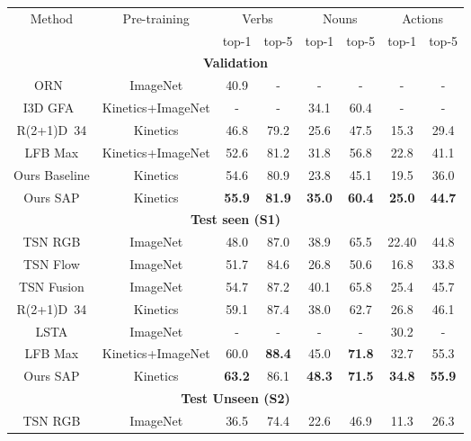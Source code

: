 \documentclass[letterpaper]{article} \usepackage{aaai20}  \usepackage{times}  \usepackage{helvet} \usepackage{courier}  \usepackage[hyphens]{url}  \usepackage{graphicx} \urlstyle{rm} \def\UrlFont{\rm}  \usepackage{graphicx}  \frenchspacing  \setlength{\pdfpagewidth}{8.5in}  \setlength{\pdfpageheight}{11in}  \usepackage{amsfonts,amssymb}
\begin{document}
\begin{table*}[t]
\centering
\begin{tabular}{|c|c|c|c|c|c|c|c|}
\hline
\multirow{2}{*}{Method} & \multirow{2}{*}{Pre-training} & \multicolumn{2}{c|}{Verbs} & \multicolumn{2}{c|}{Nouns} & \multicolumn{2}{c|}{Actions} \\ \cline{3-8} 
 &  & top-1 & top-5 & top-1 & top-5 & top-1 & top-5 \\ \hline
\multicolumn{8}{|c|}{\textbf{{Validation}}} \\ \hline
ORN~\cite{Baradel2018ObjectLV} & ImageNet & 40.9 & - & - & - & - & - \\ \hline
I3D GFA~\cite{wang2019baidu}& Kinetics+ImageNet & - & - & 34.1 & 60.4 & - & - \\ \hline
R(2+1)D~34 \cite{Ghadiyaram_2019_CVPR}& Kinetics & 46.8 & 79.2 & 25.6 & 47.5 & 15.3 & 29.4 \\ \hline
LFB Max \cite{Wu2018LongTermFB} & Kinetics+ImageNet & 52.6 & 81.2 & 31.8 & 56.8 & 22.8 & 41.1 \\ \hline
Ours Baseline & Kinetics & 54.6 & 80.9 & 23.8 & 45.1 & 19.5 & 36.0 \\ \hline
Ours SAP & Kinetics & \textbf{55.9} & \textbf{81.9} & \textbf{35.0} & \textbf{60.4} & \textbf{25.0} & \textbf{44.7} \\ \hline
\multicolumn{8}{|c|}{\textbf{{Test seen (S1)}}} \\ \hline
TSN RGB \cite{price2019evaluation}& ImageNet & 48.0 & 87.0 & 38.9 & 65.5 & 22.40 & 44.8 \\ \hline
TSN Flow \cite{price2019evaluation}& ImageNet & 51.7 & 84.6 & 26.8 & 50.6 & 16.8 & 33.8 \\ \hline
TSN Fusion \cite{price2019evaluation}& ImageNet & 54.7 & 87.2 & 40.1 & 65.8 & 25.4 & 45.7 \\ \hline
R(2+1)D~34 \cite{Ghadiyaram_2019_CVPR}& Kinetics & 59.1 & 87.4 & 38.0 & 62.7 & 26.8 & 46.1 \\ \hline
LSTA \cite{Sudhakaran_2019_CVPR}& ImageNet & - & - & - & - & 30.2 & - \\ \hline
LFB Max \cite{Wu2018LongTermFB}& Kinetics+ImageNet & 60.0 & \textbf{88.4} & 45.0 & \textbf{71.8} & 32.7 & 55.3 \\ \hline
Ours SAP & Kinetics & \textbf{63.2} & 86.1 & \textbf{48.3} & \textbf{71.5} & \textbf{34.8} & \textbf{55.9} \\ \hline
\multicolumn{8}{|c|}{\textbf{Test Unseen (S2)}} \\ \hline
TSN RGB \cite{price2019evaluation}& ImageNet & 36.5 & 74.4 & 22.6 & 46.9 & 11.3 & 26.3 \\ \hline

\end{tabular}
\end{table*}
\end{document}
